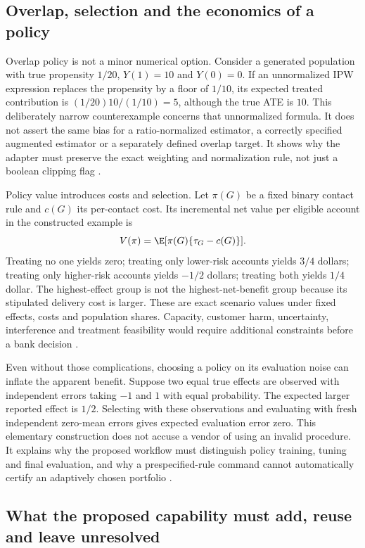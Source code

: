 \subsection{Overlap, selection and the economics of a policy}

Overlap policy is not a minor numerical option. Consider a generated
population with true propensity $1/20$, $Y(1)=10$ and $Y(0)=0$. If an
unnormalized IPW expression replaces the propensity by a floor of $1/10$,
its expected treated contribution is $(1/20)10/(1/10)=5$, although the
true ATE is $10$. This deliberately narrow counterexample concerns that
unnormalized formula. It does not assert the same bias for a ratio-normalized
estimator, a correctly specified augmented estimator or a separately
defined overlap target. It shows why the adapter must preserve the exact
weighting and normalization rule, not just a boolean clipping flag
\citep{exec13_ch_exact}.

Policy value introduces costs and selection. Let $\pi(G)$ be a fixed
binary contact rule and $c(G)$ its per-contact cost. Its incremental net
value per eligible account in the constructed example is
\[
 V(\pi)=\E[\pi(G)\{\tau_G-c(G)\}].
\]
Treating no one yields zero; treating only lower-risk accounts yields
$3/4$ dollars; treating only higher-risk accounts yields $-1/2$ dollars;
treating both yields $1/4$ dollar. The highest-effect group is not the
highest-net-benefit group because its stipulated delivery cost is larger.
These are exact scenario values under fixed effects, costs and population
shares. Capacity, customer harm, uncertainty, interference and treatment
feasibility would require additional constraints before a bank decision
\citep{exec13_ch_exact}.

Even without those complications, choosing a policy on its evaluation
noise can inflate the apparent benefit. Suppose two equal true effects
are observed with independent errors taking $-1$ and $1$ with equal
probability. The expected larger reported effect is $1/2$. Selecting
with these observations and evaluating with fresh independent zero-mean
errors gives expected evaluation error zero. This elementary construction
does not accuse a vendor of using an invalid procedure. It explains why
the proposed workflow must distinguish policy training, tuning and final
evaluation, and why a prespecified-rule command cannot automatically
certify an adaptively chosen portfolio \citep{exec13_ch_exact}.

\subsection{What the proposed capability must add, reuse and leave unresolved}

